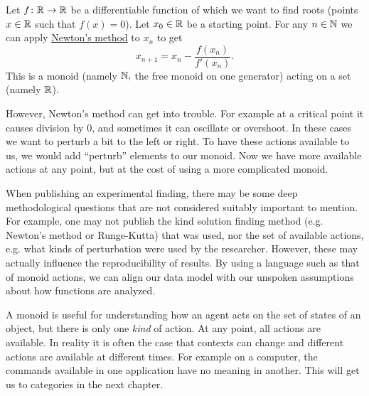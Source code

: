 \documentclass[CT4S-EN-RU]{subfiles}
\begin{document}
\begin{applicationENG}
Let $f\colon{\mathbb R}\rightarrow{\mathbb R}$ be a differentiable function of which we want to find roots (points $x\in{\mathbb R}$ such that $f(x)=0$). Let $x_0\in{\mathbb R}$ be a starting point. For any $n\in{\mathbb N}$ we can apply \href{http://en.wikipedia.org/wiki/Newton's_method}{\text Newton's method} to $x_n$ to get $$x_{n+1}=x_n-\frac{f(x_n)}{f'(x_n)}.$$
This is a monoid (namely ${\mathbb N},$ the free monoid on one generator) acting on a set (namely ${\mathbb R}$).

However, Newton's method can get into trouble. For example at a critical point it causes division by 0, and sometimes it can oscillate or overshoot. In these cases we want to perturb a bit to the left or right. To have these actions available to us, we would add “perturb” elements to our monoid. Now we have more available actions at any point, but at the cost of using a more complicated monoid.

When publishing an experimental finding, there may be some deep methodological questions that are not considered suitably important to mention. For example, one may not publish the kind solution finding method (e.g. Newton's method or Runge-Kutta) that was used, nor the set of available actions, e.g. what kinds of perturbation were used by the researcher. However, these may actually influence the reproducibility of results. By using a language such as that of monoid actions, we can align our data model with our unspoken assumptions about how functions are analyzed.
\end{applicationENG}

\begin{applicationRUS}
\end{applicationRUS}

\begin{remarkENG}
A monoid is useful for understanding how an agent acts on the set of states of an object, but there is only one {\em kind} of action. At any point, all actions are available. In reality it is often the case that contexts can change and different actions are available at different times. For example on a computer, the commands available in one application have no meaning in another. This will get us to categories in the next chapter.
\end{remarkENG}

\begin{remarkRUS}
\end{remarkRUS}

\end{document}
